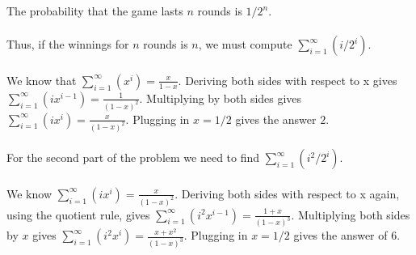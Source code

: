 The probability that the game lasts \(n\) rounds is \(1/2^{n}\).\\\\

Thus, if the winnings for \(n\) rounds is \(n\), we must compute \(\sum_{i=1}^{\infty}(i/2^{i})\).\\\\

We know that \(\sum_{i=1}^{\infty}(x^{i})=\frac{x}{1-x}\). Deriving both sides with respect to x gives \(\sum_{i=1}^{\infty}(ix^{i-1})=\frac{1}{(1-x)^{2}}\). Multiplying by both sides gives \(\sum_{i=1}^{\infty}(ix^{i})=\frac{x}{(1-x)^{2}}\). Plugging in \(x=1/2\) gives the answer \(2\). \\\\

For the second part of the problem we need to find \(\sum_{i=1}^{\infty}(i^{2}/2^{i})\).\\\\

We know \(\sum_{i=1}^{\infty}(ix^{i})=\frac{x}{(1-x)^{2}}\). Deriving both sides with respect to x again, using the quotient rule, gives \(\sum_{i=1}^{\infty}(i^{2}x^{i-1})=\frac{1+x}{(1-x)^{3}}\). Multiplying both sides by \(x\) gives \(\sum_{i=1}^{\infty}(i^{2}x^{i})=\frac{x+x^{2}}{(1-x)^{3}}\). Plugging in \(x=1/2\) gives the answer of \(6\). 
